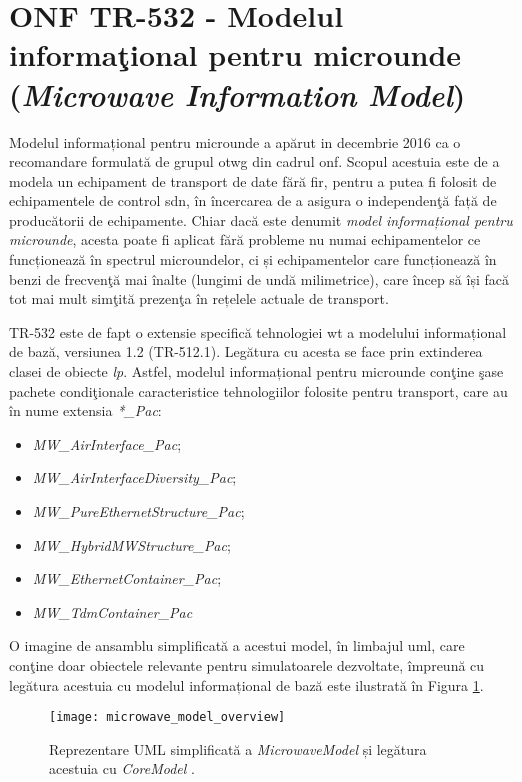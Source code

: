 \section{ONF TR-532 - Modelul informaţional pentru microunde (\textit{Microwave Information Model})}

Modelul informațional pentru microunde \cite{onftr532} a apărut in decembrie 2016 ca o recomandare formulată de grupul \gls{otwg} din cadrul \gls{onf}. Scopul acestuia este de a modela un echipament de transport de date fără fir, pentru a putea fi folosit de echipamentele de control \gls{sdn}, în încercarea de a asigura o independenţă față de producătorii de echipamente. Chiar dacă este denumit \textit{model informațional pentru microunde}, acesta poate fi aplicat fără probleme nu numai echipamentelor ce funcționează în spectrul microundelor, ci și echipamentelor care funcționează în benzi de frecvenţă mai înalte (lungimi de undă milimetrice), care încep să își facă tot mai mult simţită prezenţa în rețelele actuale de transport.

TR-532 este de fapt o extensie specifică tehnologiei \gls{wt} a modelului informațional de bază, versiunea 1.2 (TR-512.1). Legătura cu acesta se face prin extinderea clasei de obiecte \textit{\gls{lp}}. Astfel, modelul informațional pentru microunde conţine şase pachete condiţionale caracteristice tehnologiilor folosite pentru transport, care au în nume extensia \textit{*\_Pac}: 

\begin{itemize}
	\item \textit{MW\_AirInterface\_Pac};
	\item \textit{MW\_AirInterfaceDiversity\_Pac};
	\item \textit{MW\_PureEthernetStructure\_Pac};
	\item \textit{MW\_HybridMWStructure\_Pac};
	\item \textit{MW\_EthernetContainer\_Pac};
	\item \textit{MW\_TdmContainer\_Pac}
\end{itemize}

O imagine de ansamblu simplificată a acestui model, în limbajul \gls{uml}, care conţine doar obiectele relevante pentru simulatoarele dezvoltate, împreună cu legătura acestuia cu modelul informațional de bază este ilustrată în Figura \ref{fig:microwave_model}.

\begin{figure}[h]
	\centering
	\texttt{[image: microwave\_model\_overview]}
	\caption{Reprezentare UML simplificată a \textit{MicrowaveModel} și legătura acestuia cu \textit{CoreModel} \cite{onftr532}.}
	\label{fig:microwave_model}
\end{figure}

